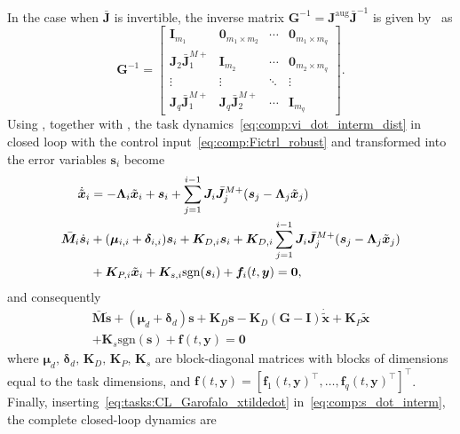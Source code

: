 \documentclass[../main.tex]{subfiles}
\begin{document}
In the case when $\bar{\bm{J}}$ is invertible, the inverse matrix $\bm{G}^{-1} = \bm{J}^{\textrm{aug}} \bar{\bm{J}}^{-1}$ is given by~\cite{Garofalo2020} as
\begin{equation} \label{G_inv}
    \bm{G}^{-1} = \left[\begin{smallmatrix}
        \bm{I}_{m_1} & \bm{0}_{m_1 \times m_2} & \cdots & \bm{0}_{m_1 \times m_q}\\
        \bm{J}_2 \bar{\bm{J}}^{M+}_1 & \bm{I}_{m_2} & \cdots & \bm{0}_{m_2 \times m_q}\\
        \vdots & \vdots & \ddots & \vdots \\
        \bm{J}_q \bar{\bm{J}}^{M+}_1 & \bm{J}_q \bar{\bm{J}}^{M+}_2 & \cdots & \bm{I}_{m_q}
    \end{smallmatrix} \right].
\end{equation}
Using , together with
,
the task dynamics~\eqref{eq:comp:vi_dot_interm_dist} in closed loop with the control input~\eqref{eq:comp:Fictrl_robust} and transformed into the error variables $\bm{s}_i$ become
 \begin{subequations}\label{eq:comp:CLtaski_robust}
    \begin{align}
        \dot{\tilde{\bm{x}}}_i &= -\bm{\Lambda}_i \tilde{\bm{x}}_i + \bm{s}_i + \sum_{j=1}^{i-1} \bm{J}_i \bar{\bm{J}}_j^{M+} ( \bm{s}_j - \bm{\Lambda}_j \tilde{\bm{x}}_j )\label{eq:comp:xitilde_dot_robust}\\
            \bar{\bm{M}}_i \dot{\bm{s}}_i &+ (\bm{\mu}_{i,i} + \bm{\delta}_{i,i}) \bm{s}_i + \bm{K}_{D,i} \bm{s}_i
            + \bm{K}_{D,i} \sum_{j=1}^{i-1} \bm{J}_i \bar{\bm{J}}_j^{M+} ( \bm{s}_j - \bm{\Lambda}_j \tilde{\bm{x}}_j ) \notag\\
            &+ \bm{K}_{P,i} \tilde{\bm{x}}_i + \bm{K}_{s,i} \textrm{sgn} (\bm{s}_i) + \bm{f}_i(t,\bm{y}) = \bm{0} ,
    \end{align}
\end{subequations}
and consequently
\begin{multline}\label{eq:comp:s_dot_interm}
    \bar{\bm{M}} \dot{\bm{s}} + (\bm{\mu}_{d} + \bm{\delta}_{d}) \bm{s} + \bm{K}_D \bm{s} - \bm{K}_D (\bm{G} - \bm{I} ) \dot{\tilde{\bm{x}}}  + \bm{K}_P \tilde{\bm{x}}\\
    + \bm{K}_s \textrm{sgn}(\bm{s}) + \bm{f}(t,\bm{y})= \bm{0}
\end{multline}
where $\bm{\mu}_{d},\, \bm{\delta}_{d},\, \bm{K}_D,\, \bm{K}_P,\, \bm{K}_s$ are block-diagonal matrices with blocks of dimensions equal to the task dimensions, and $\bm{f}(t,\bm{y}) = \left[\bm{f}_1(t,\bm{y})^\top, \ldots, \bm{f}_q(t,\bm{y})^\top \right]^\top$. Finally, inserting~\eqref{eq:tasks:CL_Garofalo_xtildedot} in~\eqref{eq:comp:s_dot_interm}, the complete closed-loop dynamics are
\end{document}
